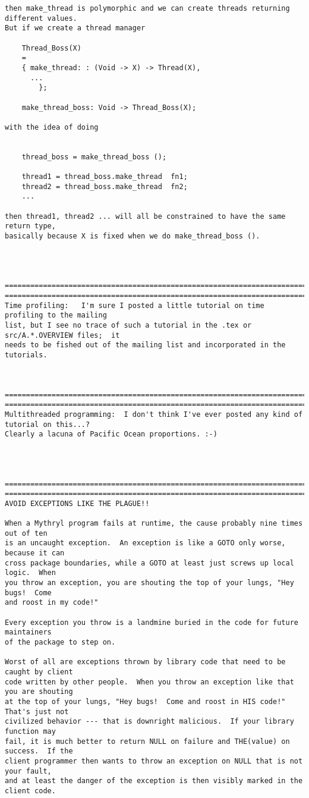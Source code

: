 \begin{verbatim}
then make_thread is polymorphic and we can create threads returning different values.
But if we create a thread manager

    Thread_Boss(X)
	=
	{ make_thread: : (Void -> X) -> Thread(X),
	  ...
        };

    make_thread_boss: Void -> Thread_Boss(X);

with the idea of doing

    
    thread_boss = make_thread_boss ();

    thread1 = thread_boss.make_thread  fn1;
    thread2 = thread_boss.make_thread  fn2;
    ...

then thread1, thread2 ... will all be constrained to have the same return type,
basically because X is fixed when we do make_thread_boss ().




====================================================================================
====================================================================================
Time profiling:   I'm sure I posted a little tutorial on time profiling to the mailing
list, but I see no trace of such a tutorial in the .tex or src/A.*.OVERVIEW files;  it
needs to be fished out of the mailing list and incorporated in the tutorials.



====================================================================================
====================================================================================
Multithreaded programming:  I don't think I've ever posted any kind of tutorial on this...?
Clearly a lacuna of Pacific Ocean proportions. :-)




====================================================================================
====================================================================================
AVOID EXCEPTIONS LIKE THE PLAGUE!!

When a Mythryl program fails at runtime, the cause probably nine times out of ten
is an uncaught exception.  An exception is like a GOTO only worse, because it can
cross package boundaries, while a GOTO at least just screws up local logic.  When
you throw an exception, you are shouting the top of your lungs, "Hey bugs!  Come
and roost in my code!"

Every exception you throw is a landmine buried in the code for future maintainers
of the package to step on.

Worst of all are exceptions thrown by library code that need to be caught by client
code written by other people.  When you throw an exception like that you are shouting
at the top of your lungs, "Hey bugs!  Come and roost in HIS code!"  That's just not
civilized behavior --- that is downright malicious.  If your library function may
fail, it is much better to return NULL on failure and THE(value) on success.  If the
client programmer then wants to throw an exception on NULL that is not your fault,
and at least the danger of the exception is then visibly marked in the client code.



\end{verbatim}
